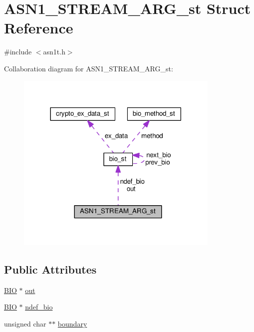 \hypertarget{struct_a_s_n1___s_t_r_e_a_m___a_r_g__st}{}\section{A\+S\+N1\+\_\+\+S\+T\+R\+E\+A\+M\+\_\+\+A\+R\+G\+\_\+st Struct Reference}
\label{struct_a_s_n1___s_t_r_e_a_m___a_r_g__st}


{\ttfamily \#include $<$asn1t.\+h$>$}



Collaboration diagram for A\+S\+N1\+\_\+\+S\+T\+R\+E\+A\+M\+\_\+\+A\+R\+G\+\_\+st\+:
\nopagebreak
\begin{figure}[H]
\begin{center}
\leavevmode
\includegraphics[width=276pt]{struct_a_s_n1___s_t_r_e_a_m___a_r_g__st__coll__graph}
\end{center}
\end{figure}
\subsection*{Public Attributes}
\begin{DoxyCompactItemize}
\item 
\hyperlink{bio_8h_af3fabae1c9af50b9312cdff41e11d1dd}{B\+IO} $\ast$ \hyperlink{struct_a_s_n1___s_t_r_e_a_m___a_r_g__st_ac35c1f4f1baf2ecf2e38d6586fe313d1}{out}
\item 
\hyperlink{bio_8h_af3fabae1c9af50b9312cdff41e11d1dd}{B\+IO} $\ast$ \hyperlink{struct_a_s_n1___s_t_r_e_a_m___a_r_g__st_a3008dd662b50834af241f3f674578e8a}{ndef\+\_\+bio}
\item 
unsigned char $\ast$$\ast$ \hyperlink{struct_a_s_n1___s_t_r_e_a_m___a_r_g__st_af36de93a0bc727a033a9db57238e4161}{boundary}
\end{DoxyCompactItemize}


